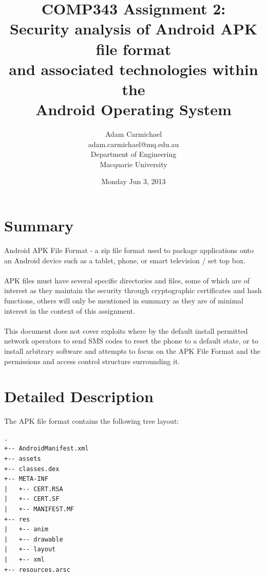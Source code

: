 \documentclass[a4paper]{article}
\begin{document}
\title{COMP343 Assignment 2:\\
Security analysis of Android APK file format \\
and associated technologies within the\\
Android Operating System}
\date{Monday Jun 3, 2013}
\author{Adam Carmichael \\
adam.carmichael@mq.edu.au \\
Department of Engineering \\
Macquarie University}
\maketitle

\tableofcontents

\section{Summary}
Android APK File Format - a zip file format used to package applications onto an
Android device such as a tablet, phone, or smart television / set top box.
\\
\\
\noindent APK files must have several specific directories and files, some of
which are of interest as they maintain the security through cryptographic certificates and
hash functions, others will only be mentioned in summary as they are of minimal
interest in the context of this assignment.
\\
\\
\noindent This document does not cover exploits where by the default install permitted
network operators to send SMS codes to reset the phone to a default state, or to
install arbitrary software and attempts to focus on the APK File Format and the
permissions and access control structure surrounding it.

\section{Detailed Description}
The APK file format contains the following tree layout:
\begin{lstlisting}
.
+-- AndroidManifest.xml
+-- assets
+-- classes.dex
+-- META-INF
|   +-- CERT.RSA
|   +-- CERT.SF
|   +-- MANIFEST.MF
+-- res
|   +-- anim
|   +-- drawable
|   +-- layout
|   +-- xml
+-- resources.arsc
\end{lstlisting}
\end{document}
